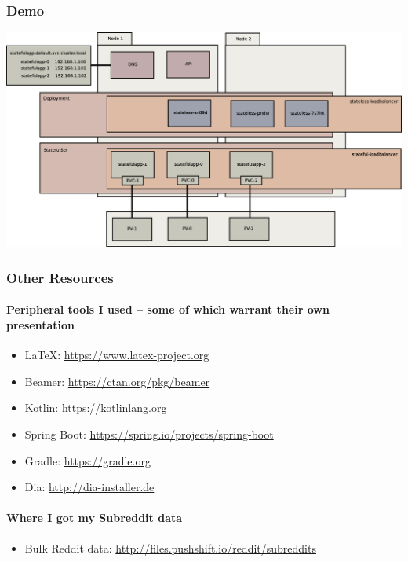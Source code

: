 \documentclass{beamer}
\begin{document}
\begin{frame}
    \frametitle{Demo}
    \includegraphics[width=\textwidth,height=\textheight,keepaspectratio]{graphics/08-loadBalancer.eps}
\end{frame}

\begin{frame}
\frametitle{Other Resources}
\paragraph{Peripheral tools I used -- some of which warrant their own presentation}
\begin{itemize}
    \item \LaTeX: \href{https://www.latex-project.org}{https://www.latex-project.org}
    \item Beamer: \href{https://ctan.org/pkg/beamer}{https://ctan.org/pkg/beamer}
    \item Kotlin: \href{https://kotlinlang.org}{https://kotlinlang.org}
    \item Spring Boot: \href{https://spring.io/projects/spring-boot}{https://spring.io/projects/spring-boot}
    \item Gradle: \href{https://gradle.org}{https://gradle.org}
    \item Dia: \href{http://dia-installer.de}{http://dia-installer.de}
\end{itemize}
\paragraph{Where I got my Subreddit data}
\begin{itemize}
    \item Bulk Reddit data: \href{http://files.pushshift.io/reddit/subreddits}{http://files.pushshift.io/reddit/subreddits}
\end{itemize}
\end{frame}
\end{document}

